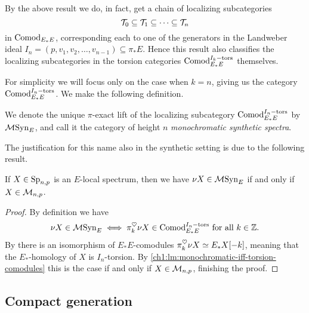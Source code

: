 \begin{remark}
    \label{ch3:add:rm:chain-of-localizing-subcategories}
    By the above result we do, in fact, get a chain of localizing subcategories
    \[\mathcal{T}_0 \subseteq \mathcal{T}_1\subseteq \cdots \subseteq \mathcal{T}_n \]
    in $\mathrm{Comod}_{E_*E}$, corresponding each to one of the generators in the Landweber ideal $I_n=(p, v_1, v_2, \ldots, v_{n-1})\subseteq \pi_* E$. Hence this result also classifies the localizing subcategories in the torsion categories $\mathrm{Comod}_{E_*E}^{I_k-\mathrm{tors}}$ themselves.  
\end{remark}

For simplicity we will focus only on the case when $k=n$, giving us the category $\mathrm{Comod}_{E_*E}^{I_n-\mathrm{tors}}$. We make the following definition. 

\begin{definition}
    We denote the unique $\pi$-exact lift of the localizing subcategory $\mathrm{Comod}_{E_*E}^{I_n-\mathrm{tors}}$ by $\mathcal{M}\mathrm{Syn}_{E}$, and call it the category of height $n$ \emph{monochromatic synthetic spectra}. 
\end{definition}

The justification for this name also in the synthetic setting is due to the following result. 

\begin{lemma}
    \label{ch3:add:lm:mono-iff-syn-mono}
    If $X\in \mathrm{Sp}_{n,p}$ is an $E$-local spectrum, then we have $\nu X \in \mathcal{M}\mathrm{Syn}_{E}$ if and only if $X\in \mathcal{M}_{n,p}$. 
\end{lemma}
\begin{proof}
    By definition we have 
    \[\nu X \in \mathcal{M}\mathrm{Syn}_{E} \iff \pi_k^\heartsuit \nu X \in \mathrm{Comod}_{E_*E}^{I_n-\mathrm{tors}} \text{ for all } k\in \mathbb{Z}.\]
    By \cite[4.21, 4.22]{pstragowski_2022} there is an isomorphism of $E_*E$-comodules $\pi_k^\heartsuit \nu X \simeq E_{*} X[-k]$, meaning that the $E_{*}$-homology of $X$ is $I_n$-torsion. By \cref{ch1:lm:monochromatic-iff-torsion-comodules} this is the case if and only if $X\in \mathcal{M}_{n,p}$, finishing the proof. 
\end{proof}










\subsection{Compact generation}

